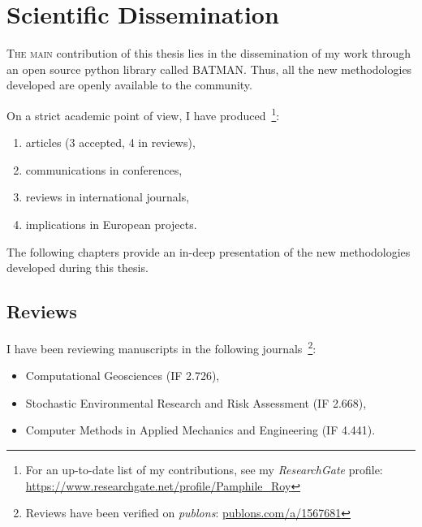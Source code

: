 \chapter{Scientific Dissemination}\label{chap:dissemination}

\lettrine{T}{he main} contribution of this thesis lies in the dissemination of my work through an open source python library called BATMAN. Thus, all the new methodologies developed are openly available to the community.

On a strict academic point of view, I have produced~\footnote{For an up-to-date list of my contributions, see my \emph{ResearchGate} profile: \href{https://www.researchgate.net/profile/Pamphile\_Roy}{https://www.researchgate.net/profile/Pamphile\_Roy}}:

\begin{enumerate}
\item[\textbf{7}] articles (3 accepted, 4 in reviews), %
\item[\textbf{7}] communications in conferences,
\item[\textbf{3}] reviews in international journals,
\item[\textbf{2}] implications in European projects.
\end{enumerate}

The following chapters provide an in-deep presentation of the new methodologies developed during this thesis.

{}

{}

\section*{Reviews}

I have been reviewing manuscripts in the following journals~\footnote{Reviews have been verified on \emph{publons}: \href{https://publons.com/a/1567681}{publons.com/a/1567681}}:

\begin{itemize}
\item Computational Geosciences (IF 2.726),
\item Stochastic Environmental Research and Risk Assessment (IF 2.668),
\item Computer Methods in Applied Mechanics and Engineering (IF  4.441).
\end{itemize}

